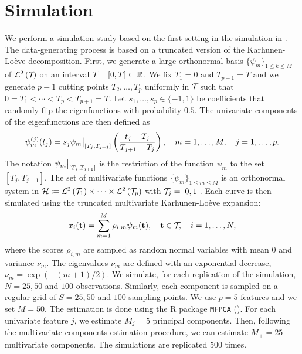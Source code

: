 
\section{Simulation} %
\label{sec:simulation}

We perform a simulation study based on the first setting in the simulation in \cite{happMultivariateFunctionalPrincipal2018}. The data-generating process is based on a truncated version of the Karhunen-Loève decomposition. First, we generate a large orthonormal basis $\{\psi_m\}_{1 \leq k \leq M}$ of $\mathcal{L}^{2}\left(\mathcal{T}_{}\right)$ on an interval $\mathcal{T}_{} = [0, T] \subset \mathbb{R}$. We fix $T_1 = 0$ and $T_{p + 1} = T$ and we generate $p - 1$ cutting points $T_2, \dots, T_p$ uniformly in $\mathcal{T}_{}$ such that $0 = T_1 < \cdots < T_p < T_{p+1} = T$. Let $s_1, \dots, s_p \in \{-1, 1\}$ be coefficients that randomly flip the eigenfunctions with probability $0.5$. The univariate components of the eigenfunctions are then defined as
\begin{equation}\label{eq:simulation_uni_component}
    \psi_m^{(j)}(t_j) = s_j \restr{\psi_m}{[T_j, T_{j + 1}]}\left(\frac{t_j - T_j}{T_{j + 1} - T_j}\right), \quad m = 1, \dots, M, \quad j = 1, \dots, p.
\end{equation}
The notation $\restr{\psi_m}{[T_j, T_{j + 1}]}$ is the restriction of the function $\psi_m$ to the set $[T_j, T_{j + 1}]$. The set of multivariate functions $\{\psi_m\}_{1 \leq m \leq M}$ is an orthonormal system in $\mathcal{H} \coloneqq \mathcal{L}^{2}\left(\mathcal{T}_{1}\right) \times \dots \times \mathcal{L}^{2}\left(\mathcal{T}_{p}\right)$ with $\mathcal{T}_{j} = [0, 1]$. Each curve is then simulated using the truncated multivariate Karhunen-Loève expansion:
\begin{equation}
    x_i(\mathbf{t}) = \sum_{m = 1}^M \rho_{i, m} \psi_m(\mathbf{t}), \quad \mathbf{t} \in \mathcal{T}_{},\quad i = 1, \dots, N,
\end{equation}
where the scores $\rho_{i, m}$ are sampled as random normal variables with mean $0$ and variance $\nu_m$. The eigenvalues $\nu_m$ are defined with an exponential decrease, $\nu_m = \exp(-(m + 1)/2)$. We simulate, for each replication of the simulation, $N = 25, 50$ and $100$ observations. Similarly, each component is sampled on a regular grid of $S = 25, 50$ and $100$ sampling points. We use $p = 5$ features and we set $M = 50$. The estimation is done using the \textsf{R} package \texttt{MFPCA} (\cite{happ-kurzObjectOrientedSoftwareFunctional2020}). For each univariate feature $j$, we estimate $M_j = 5$ principal components. Then, following the multivariate components estimation procedure, we can estimate $M_+ = 25$ multivariate components. The simulations are replicated $500$ times.

